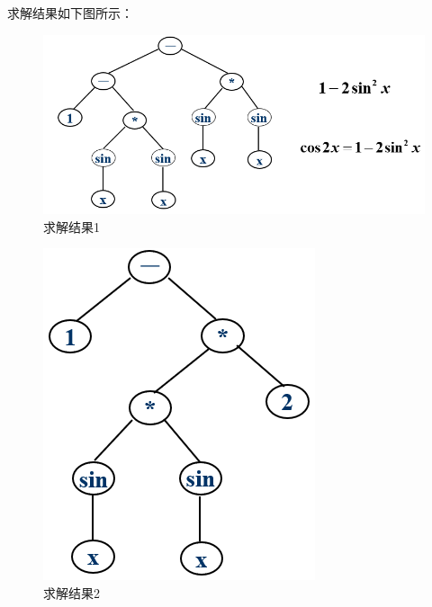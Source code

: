 \documentclass[UTF8]{ctexart}
\begin{document}
求解结果如下图所示：	
	\begin{figure}[ht]
	\centering	
	\includegraphics[scale=0.45]{images/A1.png}
	\caption{求解结果1}
	\label{fig:label}
	\end{figure}
	\begin{figure}[ht]
		\centering	
		\includegraphics[scale=0.45]{images/A2.png}
		\caption{求解结果2}
		\label{fig:label}
	\end{figure}
\end{document}
